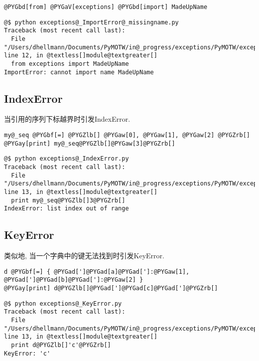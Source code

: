 \documentclass[a4paper,10pt,english]{manual}
\begin{document}
\begin{Verbatim}[commandchars=@\[\]]
@PYGbd[from] @PYGaV[exceptions] @PYGbd[import] MadeUpName
\end{Verbatim}

\begin{Verbatim}[commandchars=@\[\]]
@$ python exceptions@_ImportError@_missingname.py
Traceback (most recent call last):
  File "/Users/dhellmann/Documents/PyMOTW/in@_progress/exceptions/PyMOTW/exceptions/exceptions@_ImportError@_missingname.py", line 12, in @textless[]module@textgreater[]
  from exceptions import MadeUpName
ImportError: cannot import name MadeUpName
\end{Verbatim}


\subsection{IndexError}

当引用的序列下标越界时引发IndexError.

\begin{Verbatim}[commandchars=@\[\]]
my@_seq @PYGbf[=] @PYGZlb[] @PYGaw[0], @PYGaw[1], @PYGaw[2] @PYGZrb[]
@PYGay[print] my@_seq@PYGZlb[]@PYGaw[3]@PYGZrb[]
\end{Verbatim}

\begin{Verbatim}[commandchars=@\[\]]
@$ python exceptions@_IndexError.py
Traceback (most recent call last):
  File "/Users/dhellmann/Documents/PyMOTW/in@_progress/exceptions/PyMOTW/exceptions/exceptions@_IndexError.py", line 13, in @textless[]module@textgreater[]
  print my@_seq@PYGZlb[]3@PYGZrb[]
IndexError: list index out of range
\end{Verbatim}


\subsection{KeyError}

类似地, 当一个字典中的键无法找到时引发KeyError.

\begin{Verbatim}[commandchars=@\[\]]
d @PYGbf[=] { @PYGad[']@PYGad[a]@PYGad[']:@PYGaw[1], @PYGad[']@PYGad[b]@PYGad[']:@PYGaw[2] }
@PYGay[print] d@PYGZlb[]@PYGad[']@PYGad[c]@PYGad[']@PYGZrb[]
\end{Verbatim}

\begin{Verbatim}[commandchars=@\[\]]
@$ python exceptions@_KeyError.py
Traceback (most recent call last):
  File "/Users/dhellmann/Documents/PyMOTW/in@_progress/exceptions/PyMOTW/exceptions/exceptions@_KeyError.py", line 13, in @textless[]module@textgreater[]
  print d@PYGZlb[]'c'@PYGZrb[]
KeyError: 'c'
\end{Verbatim}
\end{document}
